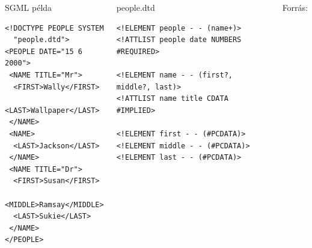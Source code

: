 \documentclass[usenames,dvipsnames,aspectratio=169]{beamer}
\begin{document}
\begin{frame}[fragile]
  \scriptsize
  \begin{columns}[T]
    \begin{exampleblock}{SGML példa}
      \begin{verbatim}
<!DOCTYPE PEOPLE SYSTEM 
  "people.dtd">
<PEOPLE DATE="15 6 2000">
 <NAME TITLE="Mr">
  <FIRST>Wally</FIRST>
  <LAST>Wallpaper</LAST>
 </NAME>
 <NAME>
  <LAST>Jackson</LAST>
 </NAME>
 <NAME TITLE="Dr">
  <FIRST>Susan</FIRST>
  <MIDDLE>Ramsay</MIDDLE>
  <LAST>Sukie</LAST>
 </NAME>
</PEOPLE>
\end{verbatim}
    \end{exampleblock}
    \begin{exampleblock}{people.dtd}
      \begin{verbatim}
<!ELEMENT people - - (name+)>
<!ATTLIST people date NUMBERS #REQUIRED>

<!ELEMENT name - - (first?, middle?, last)>
<!ATTLIST name title CDATA #IMPLIED>

<!ELEMENT first - - (#PCDATA)>
<!ELEMENT middle - - (#PCDATA)>
<!ELEMENT last - - (#PCDATA)>
\end{verbatim}
    \end{exampleblock}
    \tiny
    Forrás: 
  \end{columns}
\end{frame}
\end{document}
